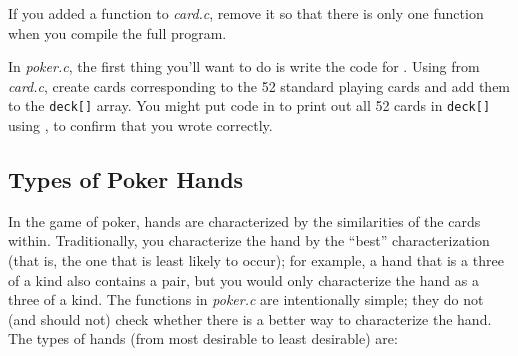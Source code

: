 If you added a  function to \textit{card.c}, remove it so that there is only one  function when you compile the full program.

In \textit{poker.c}, the first thing you'll want to do is write the code for .
Using  from \textit{card.c}, create cards corresponding to the 52 standard playing cards and add them to the \lstinline{deck[]} array.
You might put code in  to print out all 52 cards in \lstinline{deck[]} using , to confirm that you wrote  correctly.

\subsection{Types of Poker Hands} \label{subsec:typesofpokerhands}

In the game of poker, hands are characterized by the similarities of the cards within.
Traditionally, you characterize the hand by the ``best'' characterization (that is, the one that is least likely to occur);
for example, a hand that is a three of a kind also contains a pair, but you would only characterize the hand as a three of a kind.
The  functions in \textit{poker.c} are intentionally simple;
they do not (and should not) check whether there is a better way to characterize the hand.
The types of hands (from most desirable to least desirable) are:

